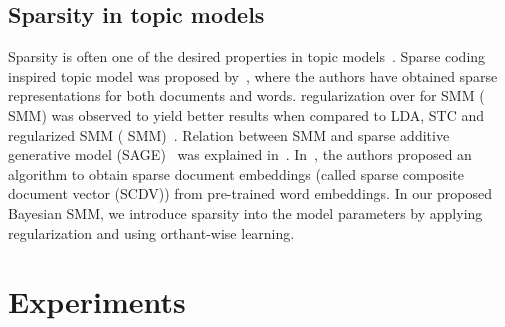 \documentclass[journal]{IEEEtran}
\begin{document}
\subsection{Sparsity in topic models}
\label{sec_sparsity_tm}
Sparsity is often one of the desired properties in topic 
models~\cite{SAGE:2011,Biksha:2007:Sparse}. Sparse coding inspired topic model 
was proposed by~\cite{Zhu:2011:STC}, where the authors have obtained sparse 
representations for both documents and words.  regularization over 
 for SMM ( SMM) was observed to yield better results when 
compared to LDA, STC and  regularized SMM ( 
SMM)~\cite{Kesiraju:2016:SMM}. Relation between SMM and sparse additive 
generative model (SAGE)~\cite{SAGE:2011} was explained in~\cite{May:2015:mivec}.
In~\cite{Mekala:2017:SCDV}, the authors proposed an algorithm to obtain sparse 
document embeddings (called sparse composite document vector (SCDV)) from 
pre-trained word embeddings. In our proposed Bayesian SMM, we introduce 
sparsity into the model parameters  by applying  
regularization and using orthant-wise learning.

\section{Experiments}
\label{sec:exp}
\end{document}
